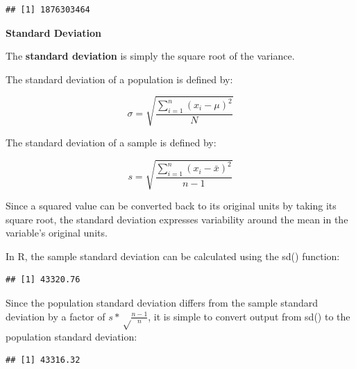 \documentclass[]{book}
\newenvironment{Shaded}{\begin{snugshade}}{\end{snugshade}}
\newcommand{\CommentTok}[1]{\textcolor[rgb]{0.56,0.35,0.01}{\textit{#1}}}
\newcommand{\DecValTok}[1]{\textcolor[rgb]{0.00,0.00,0.81}{#1}}
\newcommand{\KeywordTok}[1]{\textcolor[rgb]{0.13,0.29,0.53}{\textbf{#1}}}
\newcommand{\NormalTok}[1]{#1}
\newcommand{\OperatorTok}[1]{\textcolor[rgb]{0.81,0.36,0.00}{\textbf{#1}}}
\newcommand{\StringTok}[1]{\textcolor[rgb]{0.31,0.60,0.02}{#1}}
\begin{document}
\begin{verbatim}
## [1] 1876303464
\end{verbatim}

\textbf{Standard Deviation}

The \textbf{standard deviation} is simply the square root of the variance.

The standard deviation of a population is defined by:

\[ \sigma = \sqrt{\frac{\displaystyle\sum_{i=1}^{n} (x_{i} - \mu)^{2}}{N}} \]

The standard deviation of a sample is defined by:

\[ s = \sqrt{\frac{\displaystyle\sum_{i=1}^{n} (x_{i} - \bar{x})^{2}}{n - 1}} \]

Since a squared value can be converted back to its original units by taking its square root, the standard deviation expresses variability around the mean in the variable's original units.

In R, the sample standard deviation can be calculated using the sd() function:

\begin{Shaded}
\end{Shaded}

\begin{verbatim}
## [1] 43320.76
\end{verbatim}

Since the population standard deviation differs from the sample standard deviation by a factor of \(s * \sqrt \frac{n - 1}{n}\), it is simple to convert output from sd() to the population standard deviation:

\begin{Shaded}
\end{Shaded}

\begin{verbatim}
## [1] 43316.32
\end{verbatim}
\end{document}
